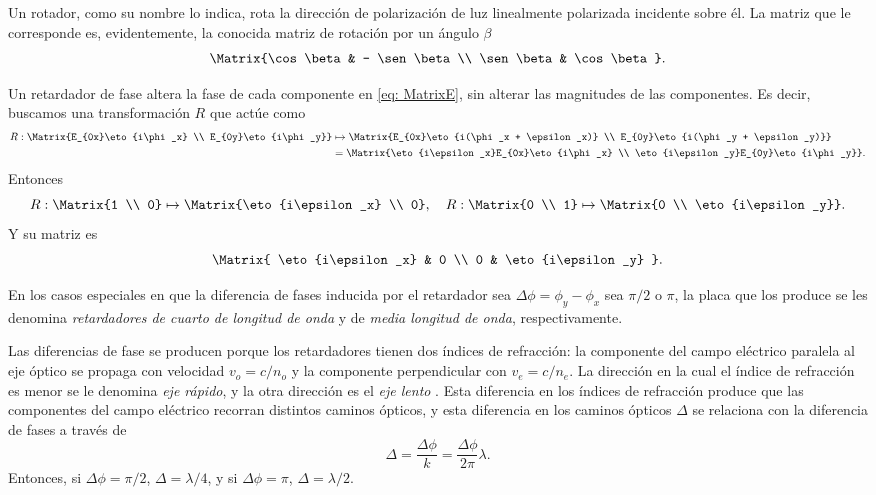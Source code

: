 Un rotador, como su nombre lo indica, rota la dirección de polarización de luz linealmente polarizada incidente sobre él. La matriz que le corresponde es, evidentemente, la conocida matriz de rotación por un ángulo $\beta$
\begin{equation}
    \Matrix{\cos \beta & - \sen \beta \\ \sen \beta & \cos \beta}.
\end{equation}

Un retardador de fase altera la fase de cada componente en \eqref{eq: MatrixE}, sin alterar las magnitudes de las componentes. Es decir, buscamos una transformación $R$ que actúe como
\begin{equation}
\begin{split}
    R : \Matrix{E_{0x}\eto{i\phi_x} \\ E_{0y}\eto{i\phi_y}} &\mapsto \Matrix{E_{0x}\eto{i(\phi_x + \epsilon_x)} \\ E_{0y}\eto{i(\phi_y + \epsilon_y)}}\\
    &= \Matrix{\eto{i\epsilon_x}E_{0x}\eto{i\phi_x} \\ \eto{i\epsilon_y}E_{0y}\eto{i\phi_y}}.
\end{split}
\end{equation}
Entonces
\begin{equation}
    R : \Matrix{1 \\ 0} \mapsto \Matrix{\eto{i\epsilon_x} \\ 0}, \quad R : \Matrix{0 \\ 1} \mapsto \Matrix{0 \\ \eto{i\epsilon_y}}.
\end{equation}
Y su matriz es
\begin{equation}\label{eq: retarMat}
    \Matrix{
        \eto{i\epsilon_x} & 0 \\ 0 & \eto{i\epsilon_y}
    }.
\end{equation}

En los casos especiales en que la diferencia de fases inducida por el retardador sea $\Delta \phi = \phi_y - \phi_x$ sea $\pi/2$ o $\pi$, la placa que los produce se les denomina \emph{retardadores de cuarto de longitud de onda} y de \emph{media longitud de onda}, respectivamente.

Las diferencias de fase se producen porque los retardadores tienen dos índices de refracción: la componente del campo eléctrico paralela al eje óptico se propaga con velocidad $v_o = c/n_o$ y la componente perpendicular con $v_e = c/n_e$. La dirección en la cual el índice de refracción es menor se le denomina \emph{eje rápido}, y la otra dirección es el \emph{eje lento} \parencite{libretexts-2022}.
Esta diferencia en los índices de refracción produce que las componentes del campo eléctrico recorran distintos caminos ópticos, y esta diferencia en los caminos ópticos $\Delta$ se relaciona con la diferencia de fases a través de
\begin{equation}
    \Delta = \frac{\Delta \phi}{k} = \frac{\Delta \phi}{2\pi}\lambda.
\end{equation}
Entonces, si $\Delta \phi = \pi/2$, $\Delta = \lambda/4$, y si $\Delta \phi = \pi$, $\Delta = \lambda / 2$.